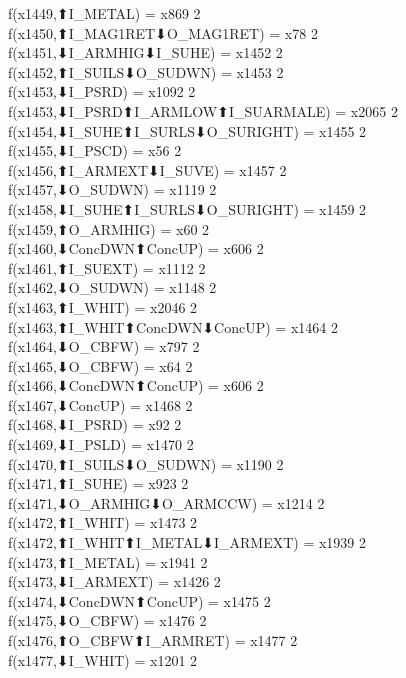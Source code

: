 f(x1449,⬆I_METAL) = x869 {2} \\
f(x1450,⬆I_MAG1RET⬇O_MAG1RET) = x78 {2} \\
f(x1451,⬇I_ARMHIG⬇I_SUHE) = x1452 {2} \\
f(x1452,⬆I_SUILS⬇O_SUDWN) = x1453 {2} \\
f(x1453,⬇I_PSRD) = x1092 {2} \\
f(x1453,⬇I_PSRD⬆I_ARMLOW⬆I_SUARMALE) = x2065 {2} \\
f(x1454,⬇I_SUHE⬆I_SURLS⬇O_SURIGHT) = x1455 {2} \\
f(x1455,⬇I_PSCD) = x56 {2} \\
f(x1456,⬆I_ARMEXT⬇I_SUVE) = x1457 {2} \\
f(x1457,⬇O_SUDWN) = x1119 {2} \\
f(x1458,⬇I_SUHE⬆I_SURLS⬇O_SURIGHT) = x1459 {2} \\
f(x1459,⬆O_ARMHIG) = x60 {2} \\
f(x1460,⬇ConcDWN⬆ConcUP) = x606 {2} \\
f(x1461,⬆I_SUEXT) = x1112 {2} \\
f(x1462,⬇O_SUDWN) = x1148 {2} \\
f(x1463,⬆I_WHIT) = x2046 {2} \\
f(x1463,⬆I_WHIT⬆ConcDWN⬇ConcUP) = x1464 {2} \\
f(x1464,⬇O_CBFW) = x797 {2} \\
f(x1465,⬇O_CBFW) = x64 {2} \\
f(x1466,⬇ConcDWN⬆ConcUP) = x606 {2} \\
f(x1467,⬇ConcUP) = x1468 {2} \\
f(x1468,⬇I_PSRD) = x92 {2} \\
f(x1469,⬇I_PSLD) = x1470 {2} \\
f(x1470,⬆I_SUILS⬇O_SUDWN) = x1190 {2} \\
f(x1471,⬆I_SUHE) = x923 {2} \\
f(x1471,⬇O_ARMHIG⬇O_ARMCCW) = x1214 {2} \\
f(x1472,⬆I_WHIT) = x1473 {2} \\
f(x1472,⬆I_WHIT⬆I_METAL⬇I_ARMEXT) = x1939 {2} \\
f(x1473,⬆I_METAL) = x1941 {2} \\
f(x1473,⬇I_ARMEXT) = x1426 {2} \\
f(x1474,⬇ConcDWN⬆ConcUP) = x1475 {2} \\
f(x1475,⬇O_CBFW) = x1476 {2} \\
f(x1476,⬆O_CBFW⬆I_ARMRET) = x1477 {2} \\
f(x1477,⬇I_WHIT) = x1201 {2} \\
